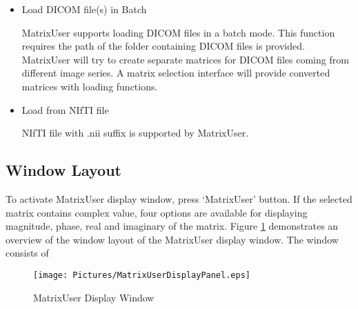 \documentclass{book}%
\begin{document}
\begin{itemize}
\item Load DICOM file(s) in Batch

MatrixUser supports loading DICOM files in a batch mode. This function requires the path of the folder containing DICOM files is provided. MatrixUser will try to create separate matrices for DICOM files coming from different image series. A matrix selection interface will provide converted matrices with loading functions.

\item Load from NIfTI file

NIfTI file with .nii suffix is supported by MatrixUser.
		
\end{itemize}


\subsection{Window Layout}

To activate MatrixUser display window, press `MatrixUser' button. If the selected matrix contains complex value, four options are available for displaying magnitude, phase, real and imaginary of the matrix. Figure \ref{fig:MatrixUserDisplayPanel} demonstrates an overview of the window layout of the MatrixUser display window. The window consists of 


\begin{figure}[htbp]
	\centering
		\texttt{[image: Pictures/MatrixUserDisplayPanel.eps]}
	\caption{MatrixUser Display Window}
	\label{fig:MatrixUserDisplayPanel}
\end{figure}
\end{document}
